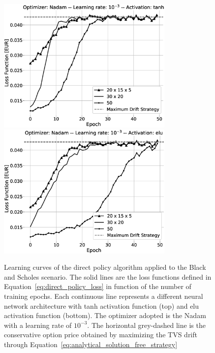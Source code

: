 \documentclass[runningheads]{m2ef}
\begin{document}
	\begin{figure}[h!]
		\centering
		\includegraphics[width=3.4in]{BS_fine_tuning_Nadam_tanh_grey.eps}
		\includegraphics[width=3.4in]{BS_fine_tuning_Nadam_elu_grey.eps}
		\caption{Learning curves of the direct policy algorithm applied to the Black and Scholes scenario. The solid lines are the loss functions defined in Equation~\eqref{eq:direct_policy_loss} in function of the number of training epochs. Each continuous line represents a different neural network architecture with tanh activation function (top) and elu activation function (bottom). The optimizer adopted is the Nadam with a learning rate of $10^{-3}$. The horizontal grey-dashed line is the conservative option price obtained by maximizing the TVS drift through Equation~\eqref{eq:analytical_solution_free_strategy}}
		\label{fig:result_bs_nadam}
	\end{figure}  
\end{document}
